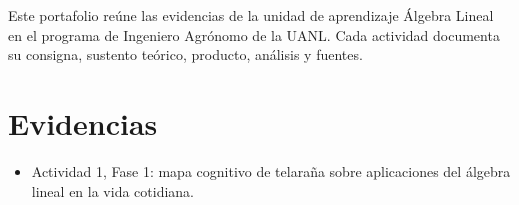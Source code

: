 \documentclass[spanish,letterpaper,oneside]{article}
\begin{document}
\templatePortrait
\templatePagecfg
\onehalfspacing

\begin{abstractd}
Este portafolio reúne las evidencias de la unidad de aprendizaje Álgebra Lineal en el programa de Ingeniero Agrónomo de la UANL. Cada actividad documenta su consigna, sustento teórico, producto, análisis y fuentes.
\end{abstractd}

\templateIndex
\templateFinalcfg

\section{Evidencias}
\begin{itemize}
  \item Actividad 1, Fase 1: mapa cognitivo de telaraña sobre aplicaciones del álgebra lineal en la vida cotidiana.
\end{itemize}


\end{document}
